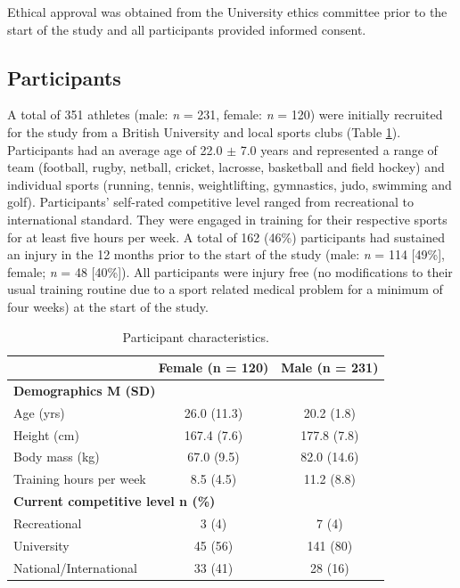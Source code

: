\documentclass[
  english,
  man]{apa6}
\begin{document}
Ethical approval was obtained from the University ethics committee prior to the start of the study and all participants provided informed consent.

\hypertarget{participants}{%
\subsection{Participants}\label{participants}}

A total of 351 athletes (male: \emph{n} = 231, female: \emph{n} = 120) were initially recruited for the study from a British University and local sports clubs (Table \ref{tab:table1}).
Participants had an average age of 22.0 \(\pm\) 7.0 years and represented a range of team (football, rugby, netball, cricket, lacrosse, basketball and field hockey) and individual sports (running, tennis, weightlifting, gymnastics, judo, swimming and golf).
Participants' self-rated competitive level ranged from recreational to international standard.
They were engaged in training for their respective sports for at least five hours per week.
A total of 162 (46\%) participants had sustained an injury in the 12 months prior to the start of the study (male: \emph{n} = 114 {[}49\%{]}, female; \emph{n} = 48 {[}40\%{]}).
All participants were injury free (no modifications to their usual training routine due to a sport related medical problem for a minimum of four weeks) at the start of the study.

\begin{table}[H]

\caption{\label{tab:table1}Participant characteristics.}
\centering
\begin{tabular}[t]{l|c|c}
\hline
\textbf{ } & \textbf{Female (n = 120)} & \textbf{Male (n = 231)}\\
\hline
\multicolumn{3}{l}{\textbf{Demographics M (SD)}}\\
\hline
\hspace{1em}Age (yrs) & 26.0 (11.3) & 20.2 (1.8)\\
\hline
\hspace{1em}Height (cm) & 167.4 (7.6) & 177.8 (7.8)\\
\hline
\hspace{1em}Body mass (kg) & 67.0 (9.5) & 82.0 (14.6)\\
\hline
\hspace{1em}Training hours per week & 8.5 (4.5) & 11.2 (8.8)\\
\hline
\multicolumn{3}{l}{\textbf{Current competitive level n (\%)}}\\
\hline
\hspace{1em}Recreational & 3 (4) & 7 (4)\\
\hline
\hspace{1em}University & 45 (56) & 141 (80)\\
\hline
\hspace{1em}National/International & 33 (41) & 28 (16)\\
\hline
\end{tabular}
\end{table}
\end{document}
